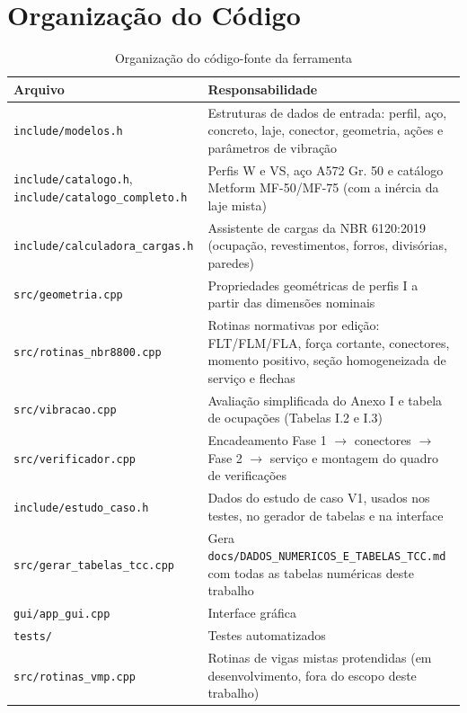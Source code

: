 \section{Organização do Código}\label{sec:3.2}

\begin{table}[htbp]
  \centering
  \caption{Organização do código-fonte da ferramenta}\label{tab:organizacao-codigo}
  {\small
  \begin{tabularx}{\textwidth}{@{}>{\raggedright\arraybackslash}p{5.4cm}L@{}}
  \toprule
  Arquivo & Responsabilidade \\
  \midrule
  \texttt{include/modelos.h} & Estruturas de dados de entrada: perfil, aço, concreto, laje, conector, geometria, ações e parâmetros de vibração \\
  \texttt{include/catalogo.h}, \texttt{include/catalogo\_completo.h} & Perfis W e VS, aço A572 Gr. 50 e catálogo Metform MF-50/MF-75 (com a inércia da laje mista) \\
  \texttt{include/calculadora\_cargas.h} & Assistente de cargas da NBR 6120:2019 (ocupação, revestimentos, forros, divisórias, paredes) \\
  \texttt{src/geometria.cpp} & Propriedades geométricas de perfis I a partir das dimensões nominais \\
  \texttt{src/rotinas\_nbr8800.cpp} & Rotinas normativas por edição: FLT/FLM/FLA, força cortante, conectores, momento positivo, seção homogeneizada de serviço e flechas \\
  \texttt{src/vibracao.cpp} & Avaliação simplificada do Anexo I e tabela de ocupações (Tabelas I.2 e I.3) \\
  \texttt{src/verificador.cpp} & Encadeamento Fase 1 \ensuremath{\rightarrow} conectores \ensuremath{\rightarrow} Fase 2 \ensuremath{\rightarrow} serviço e montagem do quadro de verificações \\
  \texttt{include/estudo\_caso.h} & Dados do estudo de caso V1, usados nos testes, no gerador de tabelas e na interface \\
  \texttt{src/gerar\_tabelas\_tcc.cpp} & Gera \texttt{docs/DADOS\_NUMERICOS\_E\_TABELAS\_TCC.md} com todas as tabelas numéricas deste trabalho \\
  \texttt{gui/app\_gui.cpp} & Interface gráfica \\
  \texttt{tests/} & Testes automatizados \\
  \texttt{src/rotinas\_vmp.cpp} & Rotinas de vigas mistas protendidas (em desenvolvimento, fora do escopo deste trabalho) \\
  \bottomrule
  \end{tabularx}
  }
\end{table}

